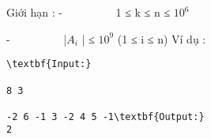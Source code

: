 Giới hạn :
-          1 ≤ k ≤ n ≤ $10^{6}$

   -          |$A_{i}$   | ≤ $10^{9}$   (1 ≤ i ≤ n)
Ví dụ :
\begin{verbatim}
\textbf{Input:}

8 3

-2 6 -1 3 -2 4 5 -1\textbf{Output:}
2\end{verbatim}
